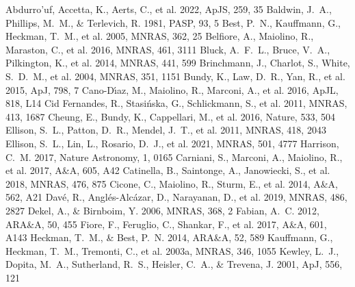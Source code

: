 \documentclass[twocolumn]{aastex631}
\begin{document}

\begin{thebibliography}{}
 Abdurro'uf, Accetta, K., Aerts, C., et al. 2022, ApJS, 259, 35
 Baldwin, J.~A., Phillips, M.~M., \& Terlevich, R. 1981, PASP, 93, 5
 Best, P.~N., Kauffmann, G., Heckman, T.~M., et al. 2005, MNRAS, 362, 25
 Belfiore, A., Maiolino, R., Maraston, C., et al. 2016, MNRAS, 461, 3111
 Bluck, A.~F.~L., Bruce, V.~A., Pilkington, K., et al. 2014, MNRAS, 441, 599
 Brinchmann, J., Charlot, S., White, S.~D.~M., et al. 2004, MNRAS, 351, 1151
 Bundy, K., Law, D.~R., Yan, R., et al. 2015, ApJ, 798, 7
 Cano-D\'{\i}az, M., Maiolino, R., Marconi, A., et al. 2016, ApJL, 818, L14
 Cid Fernandes, R., Stasi{\'n}ska, G., Schlickmann, S., et al. 2011, MNRAS, 413, 1687
 Cheung, E., Bundy, K., Cappellari, M., et al. 2016, Nature, 533, 504
 Ellison, S.~L., Patton, D.~R., Mendel, J.~T., et al. 2011, MNRAS, 418, 2043
 Ellison, S.~L., Lin, L., Rosario, D.~J., et al. 2021, MNRAS, 501, 4777
 Harrison, C.~M. 2017, Nature Astronomy, 1, 0165
 Carniani, S., Marconi, A., Maiolino, R., et al. 2017, A\&A, 605, A42
 Catinella, B., Saintonge, A., Janowiecki, S., et al. 2018, MNRAS, 476, 875
 Cicone, C., Maiolino, R., Sturm, E., et al. 2014, A\&A, 562, A21
 Dav{\'e}, R., Angl{\'e}s-Alc{\'a}zar, D., Narayanan, D., et al. 2019, MNRAS, 486, 2827
 Dekel, A., \& Birnboim, Y. 2006, MNRAS, 368, 2
 Fabian, A.~C. 2012, ARA\&A, 50, 455
 Fiore, F., Feruglio, C., Shankar, F., et al. 2017, A\&A, 601, A143
 Heckman, T.~M., \& Best, P.~N. 2014, ARA\&A, 52, 589
 Kauffmann, G., Heckman, T.~M., Tremonti, C., et al. 2003a, MNRAS, 346, 1055
 Kewley, L.~J., Dopita, M.~A., Sutherland, R.~S., Heisler, C.~A., \& Trevena, J. 2001, ApJ, 556, 121

\end{thebibliography}
\end{document}
